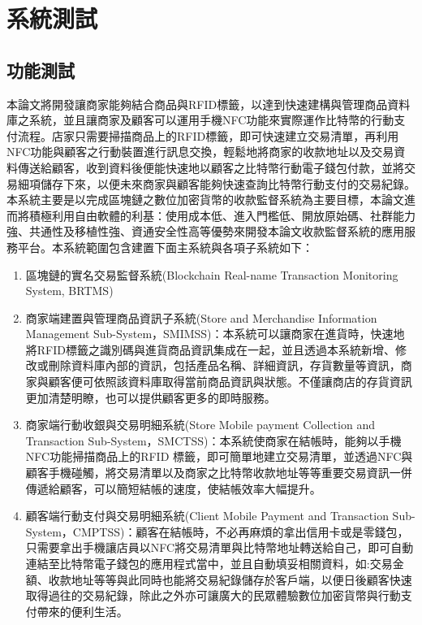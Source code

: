\chapter{系統測試}

	\section{功能測試}

	本論文將開發讓商家能夠結合商品與RFID標籤，以達到快速建構與管理商品資料庫之系統，並且讓商家及顧客可以運用手機NFC功能來實際運作比特幣的行動支付流程。店家只需要掃描商品上的RFID標籤，即可快速建立交易清單，再利用NFC功能與顧客之行動裝置進行訊息交換，輕鬆地將商家的收款地址以及交易資料傳送給顧客，收到資料後便能快速地以顧客之比特幣行動電子錢包付款，並將交易細項儲存下來，以便未來商家與顧客能夠快速查詢比特幣行動支付的交易紀錄。
	本系統主要是以完成區塊鏈之數位加密貨幣的收款監督系統為主要目標，本論文進而將積極利用自由軟體的利基：使用成本低、進入門檻低、開放原始碼、社群能力強、共通性及移植性強、資通安全性高等優勢來開發本論文收款監督系統的應用服務平台。本系統範圍包含建置下面主系統與各項子系統如下：
		\begin{enumerate}
		\item 區塊鏈的實名交易監督系統(Blockchain Real-name Transaction Monitoring System, BRTMS)
		\item 商家端建置與管理商品資訊子系統(Store and Merchandise Information Management Sub-System，SMIMSS)：本系統可以讓商家在進貨時，快速地將RFID標籤之識別碼與進貨商品資訊集成在一起，並且透過本系統新增、修改或刪除資料庫內部的資訊，包括產品名稱、詳細資訊，存貨數量等資訊，商家與顧客便可依照該資料庫取得當前商品資訊與狀態。不僅讓商店的存貨資訊更加清楚明瞭，也可以提供顧客更多的即時服務。
		\item 商家端行動收銀與交易明細系統(Store Mobile payment Collection and Transaction Sub-System，SMCTSS)：本系統使商家在結帳時，能夠以手機NFC功能掃描商品上的RFID 標籤，即可簡單地建立交易清單，並透過NFC與顧客手機碰觸，將交易清單以及商家之比特幣收款地址等等重要交易資訊一併傳遞給顧客，可以簡短結帳的速度，使結帳效率大幅提升。 
		\item 顧客端行動支付與交易明細系統(Client Mobile Payment and Transaction Sub-System，CMPTSS)：顧客在結帳時，不必再麻煩的拿出信用卡或是零錢包，只需要拿出手機讓店員以NFC將交易清單與比特幣地址轉送給自己，即可自動連結至比特幣電子錢包的應用程式當中，並且自動填妥相關資料，如:交易金額、收款地址等等與此同時也能將交易紀錄儲存於客戶端，以便日後顧客快速取得過往的交易紀錄，除此之外亦可讓廣大的民眾體驗數位加密貨幣與行動支付帶來的便利生活。
	\end{enumerate}

